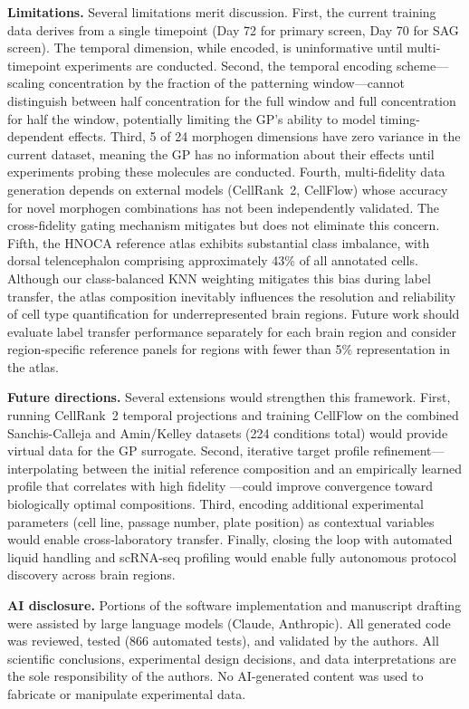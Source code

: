 \documentclass[times,twoside]{zHenriquesLab-StyleBioRxiv}
\begin{document}
\textbf{Limitations.} Several limitations merit discussion. First, the current training data derives from a single timepoint (Day 72 for primary screen, Day 70 for SAG screen). The temporal dimension, while encoded, is uninformative until multi-timepoint experiments are conducted. Second, the temporal encoding scheme---scaling concentration by the fraction of the patterning window---cannot distinguish between half concentration for the full window and full concentration for half the window, potentially limiting the GP's ability to model timing-dependent effects. Third, 5 of 24 morphogen dimensions have zero variance in the current dataset, meaning the GP has no information about their effects until experiments probing these molecules are conducted. Fourth, multi-fidelity data generation depends on external models (CellRank~2, CellFlow) whose accuracy for novel morphogen combinations has not been independently validated. The cross-fidelity gating mechanism mitigates but does not eliminate this concern. Fifth, the HNOCA reference atlas exhibits substantial class imbalance, with dorsal telencephalon comprising approximately 43\% of all annotated cells. Although our class-balanced KNN weighting mitigates this bias during label transfer, the atlas composition inevitably influences the resolution and reliability of cell type quantification for underrepresented brain regions. Future work should evaluate label transfer performance separately for each brain region and consider region-specific reference panels for regions with fewer than 5\% representation in the atlas.

\textbf{Future directions.} Several extensions would strengthen this framework. First, running CellRank~2 temporal projections and training CellFlow on the combined Sanchis-Calleja and Amin/Kelley datasets (224 conditions total) would provide virtual data for the GP surrogate. Second, iterative target profile refinement---interpolating between the initial reference composition and an empirically learned profile that correlates with high fidelity \cite{Tosh2025batchie}---could improve convergence toward biologically optimal compositions. Third, encoding additional experimental parameters (cell line, passage number, plate position) as contextual variables would enable cross-laboratory transfer. Finally, closing the loop with automated liquid handling and scRNA-seq profiling would enable fully autonomous protocol discovery across brain regions.

\textbf{AI disclosure.} Portions of the software implementation and manuscript drafting were assisted by large language models (Claude, Anthropic). All generated code was reviewed, tested (866 automated tests), and validated by the authors. All scientific conclusions, experimental design decisions, and data interpretations are the sole responsibility of the authors. No AI-generated content was used to fabricate or manipulate experimental data.
\end{document}
